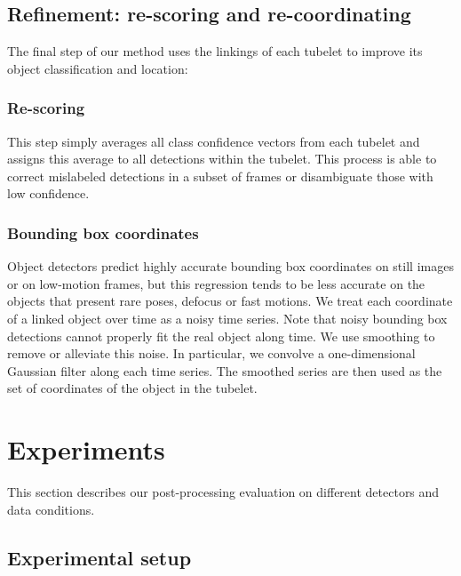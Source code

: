 \documentclass[letterpaper, 10 pt, conference]{ieeeconf}
\begin{document}
\subsection{Refinement: re-scoring and re-coordinating}

The final step of our method uses the linkings of each tubelet to improve its object classification and location:

\subsubsection{Re-scoring}
This step simply averages all class confidence vectors from each tubelet and assigns this average to all detections within the tubelet. This process is able to correct mislabeled detections in a subset of frames or disambiguate those with low confidence.


\subsubsection{Bounding box coordinates}
Object detectors predict highly accurate bounding box coordinates on still images or on low-motion frames, but this regression tends to be less accurate on the objects that present rare poses, defocus or fast motions. 
We treat each coordinate of a linked object over time as a noisy time series. 
Note that noisy bounding box detections cannot properly fit the real object along time.
We use smoothing to remove or alleviate this noise. In particular, we convolve a one-dimensional Gaussian filter along each time series. The smoothed series are then used as the set of coordinates of the object in the tubelet.




\section{Experiments}







This section describes our post-processing evaluation on different detectors and data conditions.



\subsection{Experimental setup}
\label{sec:setup}
\end{document}
